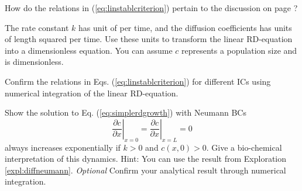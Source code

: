 \begin{question}
	How do the relations in (\ref{eq:linstablcriterion}) pertain to the discussion on page \pageref{page:nouniquness}?  
\end{question}


\begin{exerciseregion}
\begin{exercise}
	The rate constant $k$ has unit of per time, and the diffusion coefficients
  	has units of length squared per time. Use these units to transform the
  	linear RD-equation into a dimensionless equation. You can assume $c$ represents a population size 
	and is dimensionless.
\end{exercise}

\begin{exercise}
  Confirm the relations in Eqs. (\ref{eq:linstablcriterion}) for different ICs
  using numerical integration of the linear RD-equation.
\end{exercise}

\begin{exercise}
	Show the solution to Eq. (\ref{eq:simplerdgrowth}) with Neumann BCs 
	\begin{equation}
	\left. \frac{\partial c}{\partial x}\right|_{x=0} = \left. \frac{\partial c}{\partial x}\right|_{x=L} = 0  
	\end{equation}
	always increases exponentially if $k > 0$ and $c(x,0)>0$. Give a bio-chemical interpretation of this dynamics. 
	Hint: You can use the result from Exploration \ref{expl:diffneumann}. 
	\emph{Optional} Confirm your analytical result through numerical integration.
\end{exercise}
\end{exerciseregion}

